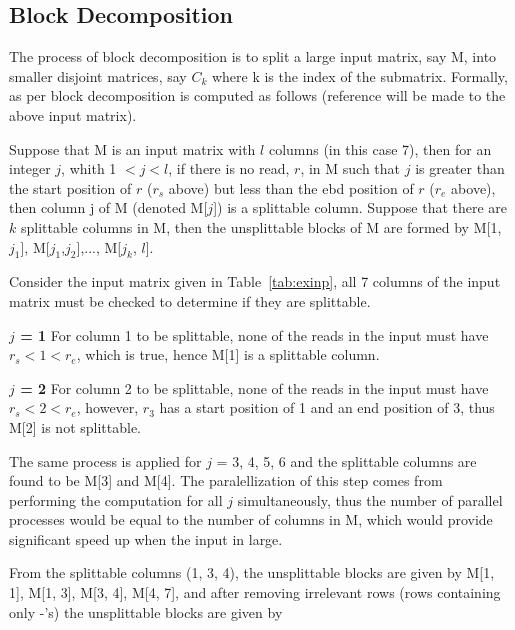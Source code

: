 \documentclass[10pt,twocolumn]{article}
\begin{document}
\subsection{Block Decomposition}

The process of block decomposition is to split a large input matrix, say M, into smaller disjoint matrices,
say $C_k$ where k is the index of the submatrix. Formally, as per \cite{chenapp:2013} block decomposition is
computed as follows (reference will be made to the above input matrix).

Suppose that M is an input matrix with $l$ columns (in this case 7), then for an integer $j$, whith 1 $< j <
l$, if there is no read, $r$, in M such that $j$ is greater than the start position of $r$ ($r_s$ above) but
less than the ebd position of $r$ ($r_e$ above), then column j of M (denoted M[$j$]) is a splittable column.
Suppose that there are $k$ splittable columns in M, then the unsplittable blocks of M are formed by M[1,
$j_1$], M[$j_1$,$j_2$],..., M[$j_k$, $l$]. 

Consider the input matrix given in Table~\ref{tab:exinp}, all 7 columns of the input matrix must be checked to
determine if they are splittable. 

\textbf{$j$ = 1} For column 1 to be splittable, none of the reads in the input must have $r_s < 1 < r_e$,
which is true, hence M[1] is a splittable column.

\textbf{$j$ = 2} For column 2 to be splittable, none of the reads in the input must have $r_s < 2 < r_e$,
however, $r_3$ has a start position of 1 and an end position of 3, thus M[2] is not splittable.

The same process is applied for $j$ = 3, 4, 5, 6 and the splittable columns are found to be M[3] and M[4]. The
paralellization of this step comes from performing the computation for all $j$ simultaneously, thus the number
of parallel processes would be equal to the number of columns in M, which would provide significant speed up
when the input in large.

From the splittable columns (1, 3, 4), the unsplittable blocks are given by M[1, 1], M[1, 3], M[3, 4], M[4,
7], and after removing irrelevant rows (rows containing only -'s) the unsplittable blocks are given by
\end{document}
